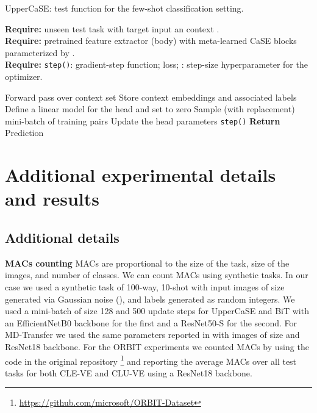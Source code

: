 \documentclass{article}
\begin{document}
\begin{algorithm}[H]
\small
\caption{UpperCaSE: test function for the few-shot classification setting.}
\label{alg:test_overview}
\textbf{Require:}   unseen test task with target input  an context . \\
\textbf{Require:}  pretrained feature extractor (body) with meta-learned CaSE blocks parameterized by . \\
\textbf{Require:} \texttt{step()}: gradient-step function;  loss;  : step-size hyperparameter for the optimizer.
\begin{algorithmic}[1]
\vspace{0.1cm}
    \State Forward pass over context set  
    \State Store context embeddings and associated labels  
    \State Define a linear model for the head  and set  to zero
     
        \State Sample (with replacement) mini-batch of training pairs 
        \State Update the head parameters  \texttt{step()}
    \EndFor
    \State \textbf{Return} Prediction  
\vspace{0.1cm}
\Statex
\end{algorithmic}
  \vspace{-0.4cm}\end{algorithm}

\section{Additional experimental details and results} \label{appendix:sec_additional_experimental_results}

\subsection{Additional details} \label{appendix:ssec_experimental_details}

\textbf{MACs counting} MACs are proportional to the size of the task, size of the images, and number of classes. We can count MACs using synthetic tasks. In our case we used a synthetic task of 100-way, 10-shot with input images of size  generated via Gaussian noise (), and labels generated as random integers. We used a mini-batch of size 128 and 500 update steps for UpperCaSE and BiT with an EfficientNetB0 backbone for the first and a ResNet50-S for the second. For MD-Transfer we used the same parameters reported in \cite{dumoulin2021comparing} with images of size  and ResNet18 backbone. For the ORBIT experiments we counted MACs by using the code in the original repository \footnote{\url{https://github.com/microsoft/ORBIT-Dataset}} and reporting the average MACs over all test tasks for both CLE-VE and CLU-VE using a ResNet18 backbone.
\end{document}
